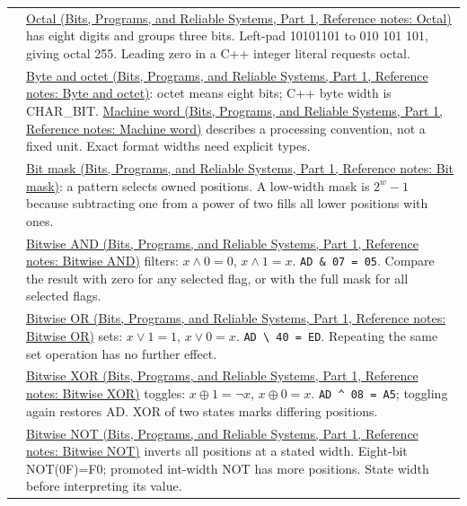 {\begin{longtable}[]{@{}
  >{\raggedright\arraybackslash}p{}
  >{\raggedright\arraybackslash}p{}@{}}
6 & \href{../01-Bits-Programs-and-Reliable-Systems-P01/main.pdf\#nameddest=appendix-17fc1bc8b305}{Octal (Bits, Programs, and Reliable Systems, Part 1, Reference notes: Octal)} has eight digits and groups three bits. Left-pad 10101101 to 010 101 101, giving octal 255. Leading zero in a C++ integer literal requests octal. \\
7 & \href{../01-Bits-Programs-and-Reliable-Systems-P01/main.pdf\#nameddest=appendix-5bee2df85484}{Byte and octet (Bits, Programs, and Reliable Systems, Part 1, Reference notes: Byte and octet)}: octet means eight bits; C++ byte width is CHAR\_BIT. \href{../01-Bits-Programs-and-Reliable-Systems-P01/main.pdf\#nameddest=appendix-d67a19507dc5}{Machine word (Bits, Programs, and Reliable Systems, Part 1, Reference notes: Machine word)} describes a processing convention, not a fixed unit. Exact format widths need explicit types. \\
8 & \href{../01-Bits-Programs-and-Reliable-Systems-P01/main.pdf\#nameddest=appendix-dbe5905163c2}{Bit mask (Bits, Programs, and Reliable Systems, Part 1, Reference notes: Bit mask)}: a pattern selects owned positions. A low-width mask is \(2^w-1\) because subtracting one from a power of two fills all lower positions with ones. \\
9 & \href{../01-Bits-Programs-and-Reliable-Systems-P01/main.pdf\#nameddest=appendix-68b52453737c}{Bitwise AND (Bits, Programs, and Reliable Systems, Part 1, Reference notes: Bitwise AND)} filters: \(x\land0=0\), \(x\land1=x\). \texttt{AD\ \&\ 07\ =\ 05}. Compare the result with zero for any selected flag, or with the full mask for all selected flags. \\
10 & \href{../01-Bits-Programs-and-Reliable-Systems-P01/main.pdf\#nameddest=appendix-a427ce8ce8a6}{Bitwise OR (Bits, Programs, and Reliable Systems, Part 1, Reference notes: Bitwise OR)} sets: \(x\lor1=1\), \(x\lor0=x\). \texttt{AD\ \textbackslash{}\textbar{}\ 40\ =\ ED}. Repeating the same set operation has no further effect. \\
11 & \href{../01-Bits-Programs-and-Reliable-Systems-P01/main.pdf\#nameddest=appendix-d49161831368}{Bitwise XOR (Bits, Programs, and Reliable Systems, Part 1, Reference notes: Bitwise XOR)} toggles: \(x\oplus1=\neg x\), \(x\oplus0=x\). \texttt{AD\ \^{}\ 08\ =\ A5}; toggling again restores AD. XOR of two states marks differing positions. \\
12 & \href{../01-Bits-Programs-and-Reliable-Systems-P01/main.pdf\#nameddest=appendix-8f38927cfc54}{Bitwise NOT (Bits, Programs, and Reliable Systems, Part 1, Reference notes: Bitwise NOT)} inverts all positions at a stated width. Eight-bit NOT(0F)=F0; promoted int-width NOT has more positions. State width before interpreting its value. \\

\end{longtable}}
